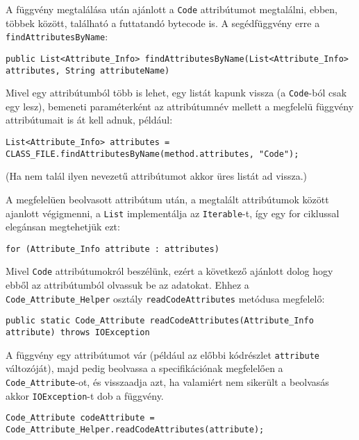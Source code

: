 A függvény megtalálása után ajánlott a \lstinline{Code} attribútumot megtalálni, ebben, többek között, található a futtatandó bytecode is. A segédfüggvény erre a \lstinline{findAttributesByName}:
\begin{verbatim}
public List<Attribute_Info> findAttributesByName(List<Attribute_Info> attributes, String attributeName)
\end{verbatim}
Mivel egy attribútumból több is lehet, egy listát kapunk vissza (a \lstinline{Code}-ból csak egy lesz), bemeneti paraméterként az attribútumnév mellett a megfelelü függvény attribútumait is át kell adnuk, például:
\begin{verbatim}
List<Attribute_Info> attributes = CLASS_FILE.findAttributesByName(method.attributes, "Code");
\end{verbatim}
(Ha nem talál ilyen nevezetű attribútumot akkor üres listát ad vissza.)

A megfelelüen beolvasott attribútum után, a megtalált attribútumok között ajanlott végigmenni, a \lstinline{List} implementálja az \lstinline{Iterable}-t, így egy for ciklussal elegánsan megtehetjük ezt:
\begin{verbatim}
for (Attribute_Info attribute : attributes)
\end{verbatim}

Mivel \lstinline{Code} attribútumokról beszélünk, ezért a következő ajánlott dolog hogy ebből az attribútumból olvassuk be az adatokat. Ehhez a \lstinline{Code_Attribute_Helper} osztály \lstinline{readCodeAttributes} metódusa megfelelő:
\begin{verbatim}
public static Code_Attribute readCodeAttributes(Attribute_Info attribute) throws IOException
\end{verbatim}
A függvény egy attribútumot vár (például az előbbi kódrészlet \lstinline{attribute} változóját), majd pedig beolvassa a specifikációnak megfelelően a \lstinline{Code_Attribute}-ot, és visszaadja azt, ha valamiért nem sikerült a beolvasás akkor \lstinline{IOException}-t dob a függvény.
\begin{verbatim}
Code_Attribute codeAttribute = Code_Attribute_Helper.readCodeAttributes(attribute);
\end{verbatim}

